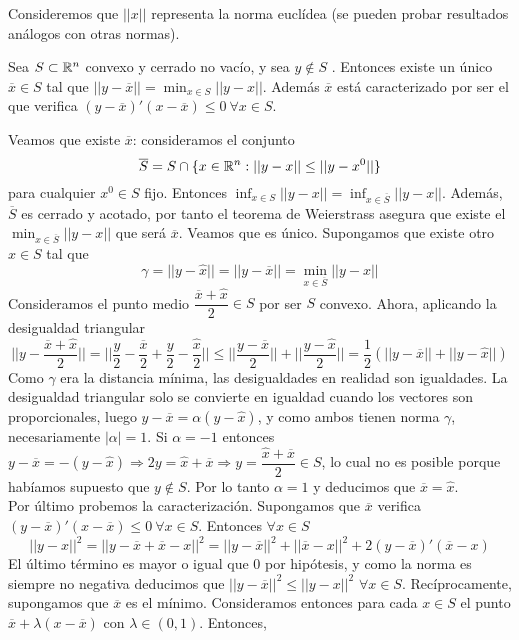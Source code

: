 \documentclass[PM.tex]{subfiles}
\begin{document}
Consideremos que $||x||$ representa la norma euclídea (se pueden probar resultados análogos con otras normas). 
\begin{theorem}
Sea $S\subset\mathbb{R}^n$ convexo y cerrado no vacío, y sea $y\not\in S$ . Entonces existe un único $\overline{x}\in S$ tal que $||y-\overline{x}||=\min_{x\in S}||y-x||$. Además $\overline{x}$ está caracterizado por ser el que verifica $(y-\overline{x})'(x-\overline{x})\leq 0\ \forall x\in S$.

\end{theorem}
\begin{dem}
Veamos que existe $\overline{x}$: consideramos el conjunto \[ \overline{S}=S\cap\{x\in\mathbb{R}^n : ||y-x||\leq ||y-x^0||\}\] para cualquier $x^0\in S$ fijo. Entonces $\inf_{x\in S}||y-x||=\inf_{x\in\overline{S}}||y-x||$. Además, $\overline{S}$ es cerrado y acotado, por tanto el teorema de Weierstrass asegura que existe el $\min_{x\in\overline{S}}||y-x||$ que será $\overline{x}$. Veamos que es único. Supongamos que existe otro $\hat{x}\in S$ tal que 
\[
\gamma=||y-\hat{x}||=||y-\overline{x}||=\min_{x\in\overline{S}}||y-x||
\]
Consideramos el punto medio $\dfrac{\overline{x}+\hat{x}}{2}\in S$ por ser $S$ convexo. Ahora, aplicando la desigualdad triangular
\[
|| y-\frac{\overline{x}+\hat{x}}{2}||=||\frac{y}{2}-\frac{\overline{x}}{2}+\frac{y}{2}-\frac{\hat{x}}{2}||\leq ||\frac{y-\overline{x}}{2}||+||\frac{y-\hat{x}}{2}||=\frac{1}{2}\left(||y-\overline{x}||+||y-\hat{x}||\right)
\]
Como $\gamma$ era la distancia mínima, las desigualdades en realidad son igualdades. La desigualdad triangular solo se convierte en igualdad cuando los vectores son proporcionales, luego $y-\overline{x}=\alpha(y-\hat{x})$, y como ambos tienen norma $\gamma$, necesariamente $|\alpha|=1$. Si $\alpha=-1$ entonces $y-\overline{x}=-(y-\hat{x})\Rightarrow 2y=\hat{x}+\overline{x}\Rightarrow y=\dfrac{\hat{x}+\overline{x}}{2}\in S$, lo cual no es posible porque habíamos supuesto que $y\not\in S$. Por lo tanto $\alpha=1$ y deducimos que $\overline{x}=\hat{x}$.\\
Por último probemos la caracterización. Supongamos que $\overline{x}$ verifica $(y-\overline{x})'(x-\overline{x})\leq 0\ \forall x\in S$. Entonces $\forall x\in S$
\[
||y-x||^2=||y-\overline{x}+\overline{x}-x||^2=||y-\overline{x}||^2+||\overline{x}-x||^2+2(y-\overline{x})'(\overline{x}-x)
\]
El último término es mayor o igual que $0$ por hipótesis, y como la norma es siempre no negativa deducimos que $ ||y-\overline{x}||^2 \leq ||y-x||^2$ $\forall x\in S$. Recíprocamente, supongamos que $\overline{x}$ es el mínimo.  Consideramos entonces para cada $x\in S$ el punto $\overline{x}+\lambda(x-\overline{x})$ con $\lambda\in (0,1)$. Entonces, 

\end{dem}
\end{document}
